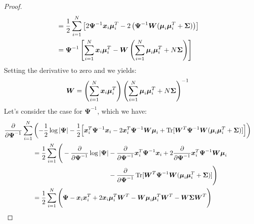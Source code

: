 \begin{proof}
\begin{equation*}
\begin{aligned}
        &= \frac{1}{2}\sum_{i=1}^N \left[ 2\boldsymbol \Psi^{-1}\boldsymbol x_i\boldsymbol \mu_i^T - 2\left( \boldsymbol \Psi^{-1}\boldsymbol W(\boldsymbol \mu_i\boldsymbol \mu_i^T + \boldsymbol \Sigma)  \right)  \right] \\
        &= \boldsymbol \Psi^{-1}\left[ \sum_{i=1}^N \boldsymbol x_i\boldsymbol \mu_i^T - \boldsymbol W\left( \sum_{i=1}^N \boldsymbol \mu_i\boldsymbol \mu_i^T + N\boldsymbol \Sigma \right) \right]  \\
    \end{aligned}
    \end{equation*}
    Setting the derivative to zero and we yields:
    \begin{equation*}
        \boldsymbol W = \left( \sum_{i=1}^N \boldsymbol x_i\boldsymbol \mu_i^T \right)\left( \sum_{i=1}^N \boldsymbol \mu_i\boldsymbol \mu_i^T + N\boldsymbol \Sigma \right)^{-1}
    \end{equation*}
    Let's consider the case for $\boldsymbol \Psi^{-1}$, which we have:
    \begin{equation*}
    \begin{aligned}
        \frac{\partial}{\partial\boldsymbol \Psi^{-1}}\sum^N_{i=1}&\bracka{ -\frac{1}{2}\log\abs{\boldsymbol \Psi} - \frac{1}{2}\Big[ \boldsymbol x_i^T\boldsymbol \Psi^{-1}\boldsymbol x_i - 2\boldsymbol x_i^T\boldsymbol \Psi^{-1}\boldsymbol W\boldsymbol \mu_i + \operatorname{Tr}[\boldsymbol W^T\boldsymbol \Psi^{-1}\boldsymbol W(\boldsymbol \mu_i\boldsymbol \mu_i^T + \boldsymbol \Sigma)] \Big]} \\ 
        &= \begin{aligned}[t]
            \frac{1}{2}\sum^N_{i=1}\Bigg(-\frac{\partial}{\partial\boldsymbol \Psi^{-1}} \log\abs{\boldsymbol \Psi} &- \frac{\partial}{\partial\boldsymbol \Psi^{-1}}\boldsymbol x_i^T\boldsymbol \Psi^{-1}\boldsymbol x_i + 2\frac{\partial}{\partial\boldsymbol \Psi^{-1}}\boldsymbol x_i^T\boldsymbol \Psi^{-1}\boldsymbol W\boldsymbol \mu_i \\
            &- \frac{\partial}{\partial\boldsymbol \Psi^{-1}}\operatorname{Tr}[\boldsymbol W^T\boldsymbol \Psi^{-1}\boldsymbol W(\boldsymbol \mu_i\boldsymbol \mu_i^T + \boldsymbol \Sigma)]\Bigg)  \\  
        \end{aligned} \\
        &= \begin{aligned}[t]    
            \frac{1}{2}\sum^N_{i=1}\Bigg( \boldsymbol \Psi - \boldsymbol x_i\boldsymbol x_i^T + 2\boldsymbol x_i\boldsymbol \mu_i^T\boldsymbol W^T - \boldsymbol W\boldsymbol \mu_i\boldsymbol \mu_i^T\boldsymbol W^T - \boldsymbol W\boldsymbol \Sigma\boldsymbol W^T\Bigg)\\

\end{aligned}
\end{aligned}
\end{equation*}
\end{proof}
